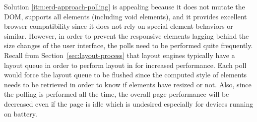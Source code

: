 \documentclass[a4paper,11pt]{kth-mag}
\begin{document}
        Solution \ref{itm:erd-approach-polling} is appealing because it does not mutate the \gls{DOM}, supports all elements (including void elements), and it provides excellent \gls{browser} compatibility since it does not rely on special \gls{element} behaviors or similar.
        However, in order to prevent the \gls{responsive} \glspl{element} lagging behind the size changes of the user interface, the polls need to be performed quite frequently.
        Recall from Section~\ref{sec:layout-process} that \glspl{layout engine} typically have a layout queue in order to perform layout in  for increased performance.
        Each poll would force the layout queue to be flushed since the computed style of \glspl{element} needs to be retrieved in order to know if \glspl{element} have resized or not.
        Also, since the polling is performed all the time, the overall page performance will be decreased even if the page is idle which is undesired especially for devices running on battery.
\end{document}
